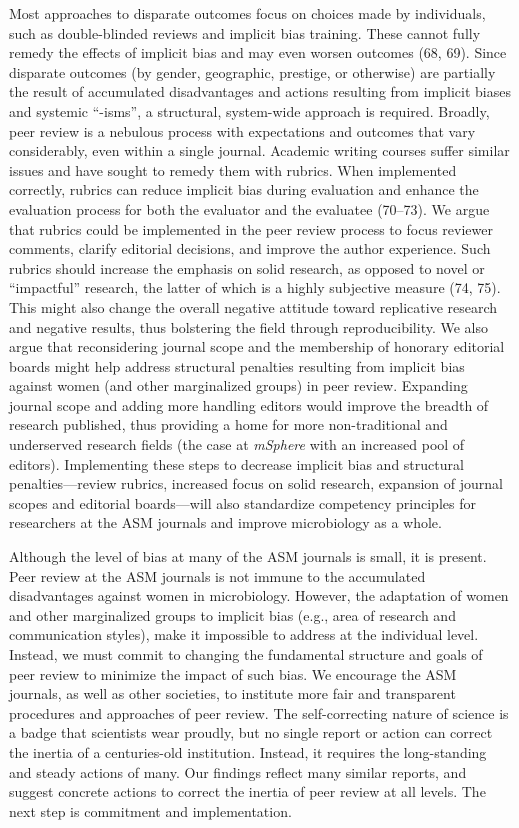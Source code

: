 \documentclass[11pt,]{article}
\begin{document}
Most approaches to disparate outcomes focus on choices made by
individuals, such as double-blinded reviews and implicit bias training.
These cannot fully remedy the effects of implicit bias and may even
worsen outcomes (68, 69). Since disparate outcomes (by gender,
geographic, prestige, or otherwise) are partially the result of
accumulated disadvantages and actions resulting from implicit biases and
systemic ``-isms'', a structural, system-wide approach is required.
Broadly, peer review is a nebulous process with expectations and
outcomes that vary considerably, even within a single journal. Academic
writing courses suffer similar issues and have sought to remedy them
with rubrics. When implemented correctly, rubrics can reduce implicit
bias during evaluation and enhance the evaluation process for both the
evaluator and the evaluatee (70--73). We argue that rubrics could be
implemented in the peer review process to focus reviewer comments,
clarify editorial decisions, and improve the author experience. Such
rubrics should increase the emphasis on solid research, as opposed to
novel or ``impactful'' research, the latter of which is a highly
subjective measure (74, 75). This might also change the overall negative
attitude toward replicative research and negative results, thus
bolstering the field through reproducibility. We also argue that
reconsidering journal scope and the membership of honorary editorial
boards might help address structural penalties resulting from implicit
bias against women (and other marginalized groups) in peer review.
Expanding journal scope and adding more handling editors would improve
the breadth of research published, thus providing a home for more
non-traditional and underserved research fields (the case at
\emph{mSphere} with an increased pool of editors). Implementing these
steps to decrease implicit bias and structural penalties---review
rubrics, increased focus on solid research, expansion of journal scopes
and editorial boards---will also standardize competency principles for
researchers at the ASM journals and improve microbiology as a whole.

Although the level of bias at many of the ASM journals is small, it is
present. Peer review at the ASM journals is not immune to the
accumulated disadvantages against women in microbiology. However, the
adaptation of women and other marginalized groups to implicit bias
(e.g., area of research and communication styles), make it impossible to
address at the individual level. Instead, we must commit to changing the
fundamental structure and goals of peer review to minimize the impact of
such bias. We encourage the ASM journals, as well as other societies, to
institute more fair and transparent procedures and approaches of peer
review. The self-correcting nature of science is a badge that scientists
wear proudly, but no single report or action can correct the inertia of
a centuries-old institution. Instead, it requires the long-standing and
steady actions of many. Our findings reflect many similar reports, and
suggest concrete actions to correct the inertia of peer review at all
levels. The next step is commitment and implementation.
\end{document}
